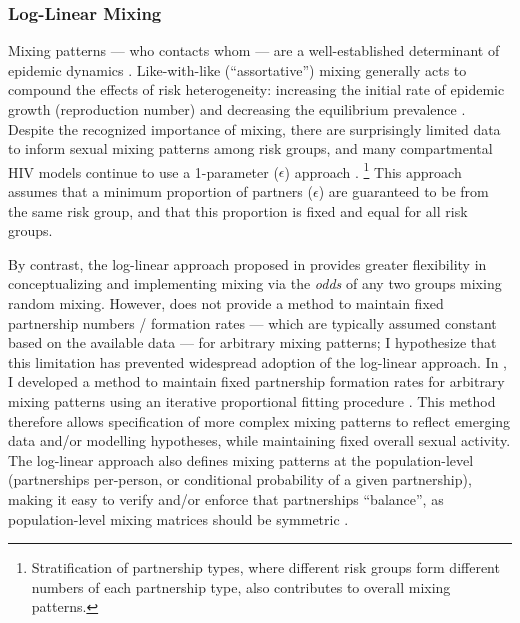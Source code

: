 \subsubsection{Log-Linear Mixing}\label{model.disc.par.mix}
Mixing patterns --- \ie who contacts whom --- are
a well-established determinant of epidemic dynamics \cite{Nold1980,Jacquez1988,Garnett1993}.
Like-with-like (``assortative'') mixing generally acts to
compound the effects of risk heterogeneity:
increasing the initial rate of epidemic growth (reproduction number)
and decreasing the equilibrium prevalence \cite{Jacquez1988}.
Despite the recognized importance of mixing,
there are surprisingly limited data to inform sexual mixing patterns among risk groups, and
many compartmental HIV models continue to use a 1-parameter ($\epsilon$) approach
\cite{Nold1980,Knight2022sr}.%
\footnote{Stratification of partnership types,
  where different risk groups form different numbers of each partnership type,
  also contributes to overall mixing patterns.}
This approach assumes that a minimum proportion of partners ($\epsilon$)
are guaranteed to be from the same risk group,
and that this proportion is fixed and equal for all risk groups.
\par
By contrast, the log-linear approach proposed in \cite{Morris1991}
provides greater flexibility in conceptualizing and implementing mixing via
the \emph{odds} of any two groups mixing \vs random mixing.
However, \cite{Morris1991} does not provide a method to
maintain fixed partnership numbers / formation rates
--- which are typically assumed constant based on the available data ---
for arbitrary mixing patterns;
I hypothesize that this limitation has prevented widespread adoption of the log-linear approach.
In , I developed a method to maintain
fixed partnership formation rates for arbitrary mixing patterns
using an iterative proportional fitting procedure \cite{Ruschendorf1995}.
This method therefore allows specification of more complex mixing patterns
to reflect emerging data and/or modelling hypotheses,
while maintaining fixed overall sexual activity.
The log-linear approach also defines mixing patterns at the population-level
(\vs partnerships per-person, or conditional probability of a given partnership),
making it easy to verify and/or enforce that partnerships ``balance'',
as population-level mixing matrices should be symmetric \cite{Knight2023chap}.
